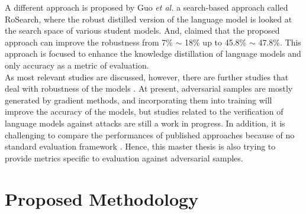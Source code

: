\documentclass[%
	BCOR=8mm, %
	DIV=12,
	toc=bibliography, %
	toc=listof, %
	oneside, %
	egregdoesnotlikesansseriftitles, %
	]{scrbook}
\begin{document}
A different approach is proposed by Guo \textit{et al.} \cite{guo_rosearch_2021} a search-based approach called RoSearch, where the robust distilled version of the language model is looked at the search space of various student models. And, claimed that the proposed approach can improve the robustness from 7\% $\sim$ 18\% up to 45.8\% $\sim$ 47.8\%. This approach is focused to enhance the knowledge distillation of language models and only accuracy as a metric of evaluation.\\
As most relevant studies are discussed, however, there are further studies that deal with robustness of the models \cite{wang_infobert_2020, shi_robustness_2020,jones_robust_2020,jiang_smart_2020,malkiel_mml_2019,liu_transfer_2019}.
At present, adversarial samples are mostly generated by gradient methods, and incorporating them into training will improve the accuracy of the models, but studies related to the verification of language models against attacks are still a work in progress. In addition, it is challenging to compare the performances of published approaches because of no standard evaluation framework \cite{moradi_evaluating_2021-1}. Hence, this master thesis is also trying to provide metrics specific to evaluation against adversarial samples.


\chapter{ Proposed Methodology}
\label{chapter:methodology}
\end{document}
